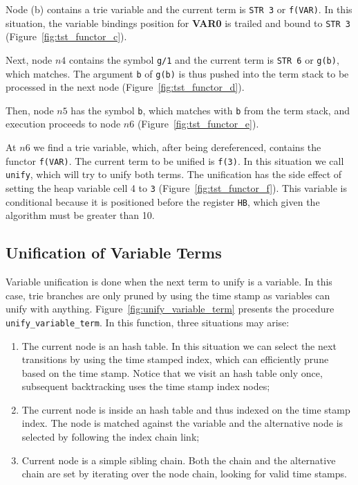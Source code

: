 Node (b) contains a trie variable and the current term is \texttt{STR 3} or \texttt{f(VAR)}.
In this situation, the variable bindings position for \textbf{VAR0} is trailed and bound to \texttt{STR 3}
(Figure~\ref{fig:tst_functor_c}).

Next, node $n4$ contains the symbol \texttt{g/1} and the current term is \texttt{STR 6}
or \texttt{g(b)}, which matches. The argument \texttt{b} of \texttt{g(b)}
is thus pushed into the term stack to be processed in the next node (Figure~\ref{fig:tst_functor_d}).

Then, node $n5$ has the symbol \texttt{b}, which matches with \texttt{b} from the term stack, and
execution proceeds to node $n6$ (Figure~\ref{fig:tst_functor_e}).

At $n6$ we find a trie variable, which, after being dereferenced, contains the
functor \texttt{f(VAR)}. The current term to be unified is \texttt{f(3)}.
In this situation we call \texttt{unify}, which will try to unify both terms.
The unification has the side effect of setting the heap variable cell 4 to \texttt{3}
(Figure~\ref{fig:tst_functor_f}).
This variable is conditional because it is positioned before the register \texttt{HB},
which given the algorithm must be greater than 10.

\subsection{Unification of Variable Terms}

\begin{samepage}
Variable unification is done when the next term to unify is a variable. In this case, trie branches are only pruned
by using the time stamp as variables can unify with anything.
Figure~\ref{fig:unify_variable_term} presents the procedure \texttt{unify\_variable\_term}. In this function, three
situations may arise:

\begin{enumerate}
  \item The current node is an hash table. In this situation we can select the next transitions
   by using the time stamped index, which can efficiently prune based on the time stamp. Notice that we visit
   an hash table only once, subsequent backtracking uses the time stamp index nodes;
  \item The current node is inside an hash table and thus indexed on the time stamp index.
   The node is matched against the variable and the alternative node is selected by following
   the index chain link;
  \item Current node is a simple sibling chain. Both the chain and the alternative chain are set by
   iterating over the node chain, looking for valid time stamps.
\end{enumerate}
\end{samepage}

